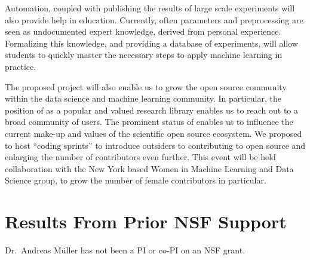 Automation, coupled with publishing the results of large scale experiments will
also provide help in education. Currently, often parameters and preprocessing
are seen as undocumented expert knowledge, derived from personal experience.
Formalizing this knowledge, and providing a database of experiments, will allow
students to quickly master the necessary steps to apply machine learning in
practice.

The proposed project will also enable us to grow the open source community
within the data science and machine learning community.  In particular, the
position of \sklearn{} as a popular and valued research library enables us to
reach out to a broad community of users.  The prominent status of \sklearn{}
enables us to influence the current make-up and values of the scientific open
source ecosystem.  We proposed to host ``coding sprints'' to introduce
outsiders to contributing to open source and enlarging the number of
contributors even further. This event will be held collaboration with the New
York based Women in Machine Learning and Data Science group, to grow the number
of female contributors in particular. 


\section{Results From Prior NSF Support}
Dr.\ Andreas M\"uller has not been a PI or co-PI on an NSF grant.
